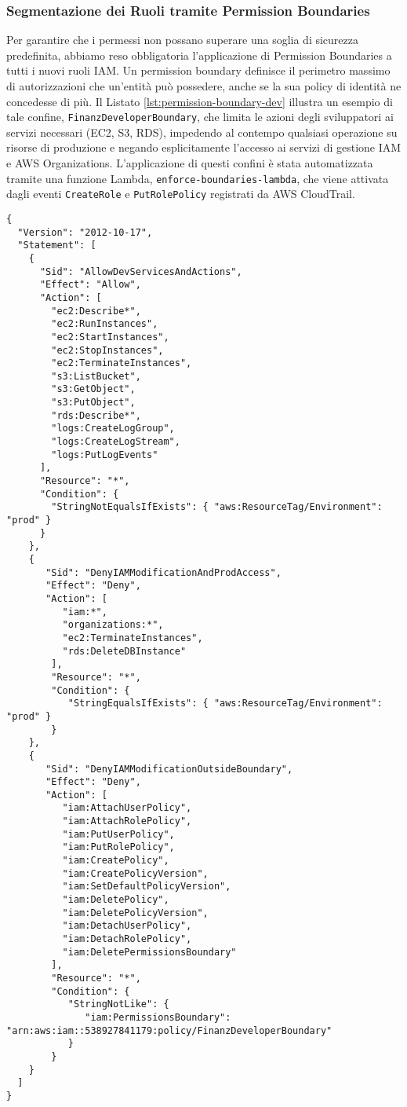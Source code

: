 \subsubsection{Segmentazione dei Ruoli tramite Permission Boundaries}
Per garantire che i permessi non possano superare una soglia di sicurezza predefinita, abbiamo reso obbligatoria l'applicazione di Permission Boundaries a tutti i nuovi ruoli IAM. Un permission boundary definisce il perimetro massimo di autorizzazioni che un'entità può possedere, anche se la sua policy di identità ne concedesse di più. Il Listato \ref{lst:permission-boundary-dev} illustra un esempio di tale confine, \texttt{FinanzDeveloperBoundary}, che limita le azioni degli sviluppatori ai servizi necessari (EC2, S3, RDS), impedendo al contempo qualsiasi operazione su risorse di produzione e negando esplicitamente l'accesso ai servizi di gestione IAM e AWS Organizations. L'applicazione di questi confini è stata automatizzata tramite una funzione Lambda, \texttt{enforce-boundaries-lambda}, che viene attivata dagli eventi \texttt{CreateRole} e \texttt{PutRolePolicy} registrati da AWS CloudTrail.
\begin{lstlisting}[style=json, caption={Esempio di \texttt{FinanzDeveloperBoundary}}, label=lst:permission-boundary-dev]
{
  "Version": "2012-10-17",
  "Statement": [
    {
      "Sid": "AllowDevServicesAndActions",
      "Effect": "Allow",
      "Action": [
        "ec2:Describe*",
        "ec2:RunInstances", 
        "ec2:StartInstances",
        "ec2:StopInstances",
        "ec2:TerminateInstances",
        "s3:ListBucket",
        "s3:GetObject",
        "s3:PutObject", 
        "rds:Describe*",
        "logs:CreateLogGroup",
        "logs:CreateLogStream",
        "logs:PutLogEvents"
      ],
      "Resource": "*",
      "Condition": {
        "StringNotEqualsIfExists": { "aws:ResourceTag/Environment": "prod" } 
      }
    },
    {
       "Sid": "DenyIAMModificationAndProdAccess",
       "Effect": "Deny",
       "Action": [
          "iam:*", 
          "organizations:*",
          "ec2:TerminateInstances", 
          "rds:DeleteDBInstance" 
        ],
        "Resource": "*",
        "Condition": {
           "StringEqualsIfExists": { "aws:ResourceTag/Environment": "prod" } 
        }
    },
    {
       "Sid": "DenyIAMModificationOutsideBoundary",
       "Effect": "Deny",
       "Action": [
          "iam:AttachUserPolicy",
          "iam:AttachRolePolicy",
          "iam:PutUserPolicy",
          "iam:PutRolePolicy",
          "iam:CreatePolicy",
          "iam:CreatePolicyVersion",
          "iam:SetDefaultPolicyVersion",
          "iam:DeletePolicy",
          "iam:DeletePolicyVersion",
          "iam:DetachUserPolicy",
          "iam:DetachRolePolicy",
          "iam:DeletePermissionsBoundary" 
        ],
        "Resource": "*",
        "Condition": {
           "StringNotLike": {
              "iam:PermissionsBoundary": "arn:aws:iam::538927841179:policy/FinanzDeveloperBoundary" 
           }
        }
    }
  ]
}
\end{lstlisting}

